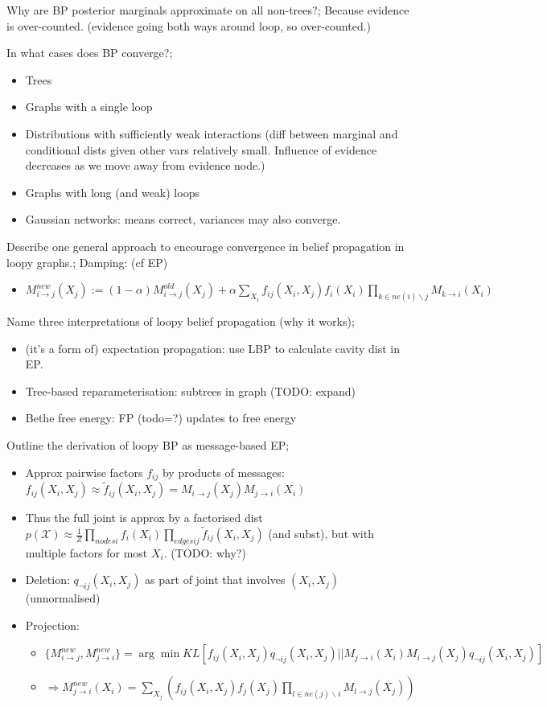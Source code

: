 \documentclass{article}
\begin{document}
Why are BP posterior marginals approximate on all non-trees?; Because evidence is over-counted. (evidence going both ways around loop, so over-counted.)

In what cases does BP converge?; \begin{itemize} \item Trees \item Graphs with a single loop \item Distributions with sufficiently weak interactions (diff between marginal and conditional dists given other vars relatively small. Influence of evidence decreases as we move away from evidence node.) \item Graphs with long (and weak) loops \item Gaussian networks: means correct, variances may also converge. \end{itemize}

Describe one general approach to encourage convergence in belief propagation in loopy graphs.; Damping: (cf EP) \begin{itemize} \item $M^{new}_{i\rightarrow j}(X_j):= (1-\alpha)M^{old}_{i\rightarrow j}(X_j) + \alpha\sum_{X_i}f_{ij}(X_i, X_j)f_i(X_i)\prod_{k\in ne(i)\backslash j}M_{k\rightarrow i}(X_i)$ \end{itemize} 

Name three interpretations of loopy belief propagation (why it works); \begin{itemize} \item (it's a form of) expectation propagation: use LBP to calculate cavity dist in EP. \item Tree-based reparameterisation: subtrees in graph (TODO: expand) \item Bethe free energy: FP (todo=?) updates to free energy \end{itemize}

Outline the derivation of loopy BP as message-based EP; \begin{itemize} \item Approx pairwise factors $f_{ij}$ by products of messages: $f_{ij}(X_i, X_j) \approx \tilde{f}_{ij}(X_i, X_j) = M_{i\rightarrow j}(X_j)M_{j\rightarrow i}(X_i)$ \item Thus the full joint is approx by a factorised dist $p(\mathcal{X}) \approx \frac{1}{Z}\prod_{nodes i}f_i(X_i)\prod_{edges ij}\tilde{f}_{ij}(X_i, X_j)$ (and subst), but with multiple factors for most $X_i$. (TODO: why?) \item Deletion: $q_{\neg ij}(X_i, X_j)$ as part of joint that involves $(X_i, X_j)$ (unnormalised) \item Projection: \begin{itemize} \item $\{M^{new}_{i\rightarrow j}, M^{new}_{j \rightarrow i}\} = \arg\min KL[f_{ij}(X_i, X_j)q_{\neg ij}(X_i, X_j) || M_{j\rightarrow i}(X_i) M_{i\rightarrow j}(X_j)q_{\neg ij}(X_i, X_j)] $ \item $\Rightarrow M_{j\rightarrow i}^{new}(X_i) = \sum_{X_j}(f_{ij}(X_i, X_j)f_j(X_j)\prod_{l\in ne(j)\backslash i}M_{l\rightarrow j}(X_j))$ \end{itemize} \end{itemize}
\end{document}
